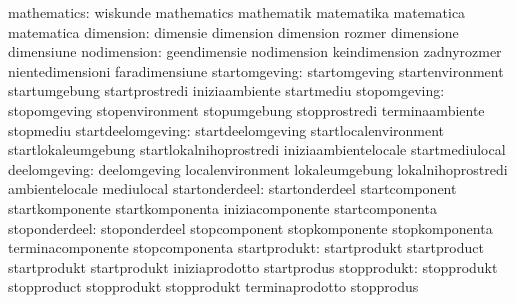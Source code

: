                      mathematics: wiskunde                         mathematics
                                  mathematik                       matematika
                                  matematica                       matematica
                       dimension: dimensie                         dimension
                                  dimension                        rozmer
                                  dimensione                       dimensiune
                     nodimension: geendimensie                     nodimension
                                  keindimension                    zadnyrozmer
                                  nientedimensioni                 faradimensiune
                   startomgeving: startomgeving                    startenvironment
                                  startumgebung                    startprostredi
                                  iniziaambiente                   startmediu
                    stopomgeving: stopomgeving                     stopenvironment
                                  stopumgebung                     stopprostredi
                                  terminaambiente                  stopmediu
               startdeelomgeving: startdeelomgeving                startlocalenvironment
                                  startlokaleumgebung              startlokalnihoprostredi
                                  iniziaambientelocale             startmediulocal
                    deelomgeving: deelomgeving                     localenvironment
                                  lokaleumgebung                   lokalnihoprostredi
                                  ambientelocale                   mediulocal
                  startonderdeel: startonderdeel                   startcomponent
                                  startkomponente                  startkomponenta
                                  iniziacomponente                 startcomponenta
                   stoponderdeel: stoponderdeel                    stopcomponent
                                  stopkomponente                   stopkomponenta
                                  terminacomponente                stopcomponenta
                    startprodukt: startprodukt                     startproduct
                                  startprodukt                     startprodukt
                                  iniziaprodotto                   startprodus
                     stopprodukt: stopprodukt                      stopproduct
                                  stopprodukt                      stopprodukt
                                  terminaprodotto                  stopprodus
